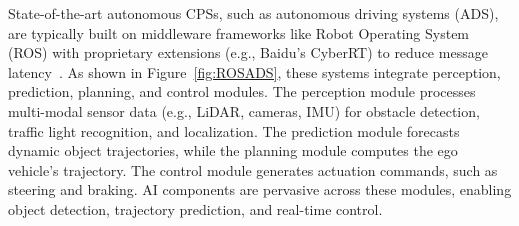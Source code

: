 State-of-the-art autonomous CPSs, such as autonomous driving systems (ADS), are typically built on middleware frameworks like Robot Operating System (ROS) with proprietary extensions (e.g., Baidu’s CyberRT) to reduce message latency~\cite{zheng2024testing, liang2023rlaga, lou2022testing, deng2021survey, prakash2021multi}. As shown in Figure~\ref{fig:ROSADS}, these systems integrate perception, prediction, planning, and control modules. The perception module processes multi-modal sensor data (e.g., LiDAR, cameras, IMU) for obstacle detection, traffic light recognition, and localization. The prediction module forecasts dynamic object trajectories, while the planning module computes the ego vehicle’s trajectory. The control module generates actuation commands, such as steering and braking. AI components are pervasive across these modules, enabling object detection, trajectory prediction, and real-time control.

